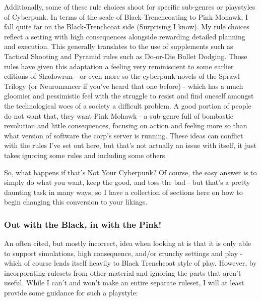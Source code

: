 \begin{multicols}{2}
	Additionally, some of these rule choices shoot for specific sub-genres or playstyles of Cyberpunk. In terms of the scale of Black-Trenchcoating to Pink Mohawk, I fall quite far on the Black-Trenchcoat side (Surprising I know). My rule choices reflect a setting with high consequences alongside rewarding detailed planning and execution. This generally translates to the use of supplements such as Tactical Shooting and Pyramid rules such as Do-or-Die Bullet Dodging. Those rules have given this adaptation a feeling very reminiscient to some earlier editions of Shadowrun - or even more so the cyberpunk novels of the Sprawl Trilogy (or Neuromancer if you've heard that one before) - which has a much gloomier and pessimistic feel with the struggle to resist and find oneself amongst the technological woes of a society a difficult problem. A good portion of people do not want that, they want Pink Mohawk - a sub-genre full of bombastic revolution and little consequences, focusing on action and feeling more so than what version of software the corp's server is running. These ideas can conflict with the rules I've set out here, but that's not actually an issue with \GURPS itself, it just takes ignoring some rules and including some others.
	
	So, what happens if that's Not Your Cyberpunk? Of course, the easy answer is to simply do what you want, keep the good, and toss the bad - but that's a pretty daunting task in many ways, so I have a collection of sections here on how to begin changing this conversion to your likings.
	
	\subsubsection{Out with the Black, in with the Pink!}
	
	An often cited, but mostly incorrect, idea when looking at \GURPS is that it is only able to support simulations, high consequence, and/or crunchy settings and play - which of course lends itself heavily to Black Trenchcoat style of play. However, by incorporating rulesets from other \GURPS material and ignoring the parts that aren't useful. While I can't and won't make an entire separate ruleset, I will at least provide some guidance for such a playstyle:
	

\end{multicols}
